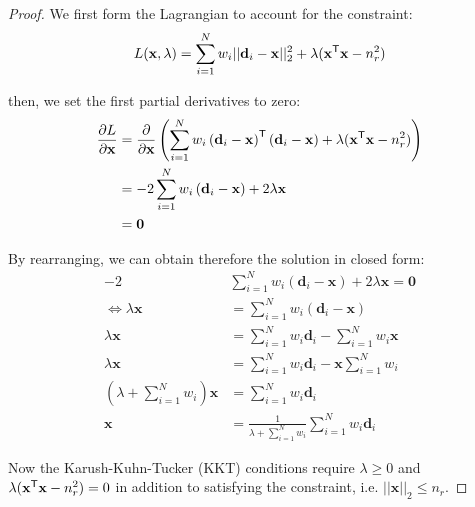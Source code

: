 \begin{proof}
	We first form the Lagrangian to account for the constraint:
	\begin{equation}
		\begin{aligned}	
			L(\mathbf{x}, \lambda) =  \sum_{i=1}^{N} w_i ||\mathbf{d}_i - \mathbf{x}||_2^2 + \lambda (
			\mathbf{x}^{\mathsf{T}} \mathbf{x} - n_r^2)\\
		\end{aligned}
	\end{equation}
	
	then, we set the first partial derivatives to zero: 
	\begin{equation}
		\begin{aligned}	
			\frac{\partial L}{\partial \mathbf{x}} &= \frac{\partial }{\partial \mathbf{x}} \left( \sum_{i=1}^{N} w_i \left(\mathbf{d}_i - \mathbf{x}\right)^{\mathsf{T}} \left(\mathbf{d}_i - \mathbf{x}\right) + \lambda (
			\mathbf{x}^{\mathsf{T}} \mathbf{x} - n_r^2) \right)\\
			&= - 2\sum_{i=1}^{N} w_i \left(\mathbf{d}_i - \mathbf{x}\right) + 2 \lambda \mathbf{x}\\
			&= \mathbf{0}\\
		\end{aligned}
	\end{equation}
	
	
	By rearranging, we can obtain therefore the solution in closed form:
	\begin{equation}
		\label{eq:trans-qcqp-lagrangian}
		\begin{aligned}	
			-2  &\sum_{i=1}^{N}  w_i \left(\mathbf{d}_i - \mathbf{x}\right) + 2 \lambda \mathbf{x} = \mathbf{0}\\
			\iff \lambda \mathbf{x} &= \sum_{i=1}^{N} w_i \left(\mathbf{d}_i - \mathbf{x}\right)\\
			\lambda \mathbf{x} &= \sum_{i=1}^{N}  w_i \mathbf{d}_i  - \sum_{i=1}^{N}  w_i \mathbf{x}\\
			\lambda \mathbf{x} &= \sum_{i=1}^{N}  w_i \mathbf{d}_i  - \mathbf{x} \sum_{i=1}^{N}  w_i\\
			\left( \lambda + \sum_{i=1}^{N}  w_i \right) \mathbf{x} &= \sum_{i=1}^{N} w_i \mathbf{d}_i \\
			\mathbf{x} &= \frac{1}{\lambda + \sum_{i=1}^{N}  w_i} \sum_{i=1}^{N} w_i \mathbf{d}_i 
		\end{aligned}
	\end{equation}
	
	Now the Karush-Kuhn-Tucker (KKT) conditions require $\lambda \geq 0$ and $\lambda (
	\mathbf{x}^{\mathsf{T}} \mathbf{x} - n_r^2) = 0$ in addition to satisfying the constraint, i.e. $|| \mathbf{x}||_2 \leq n_r$.
\end{proof}
	
